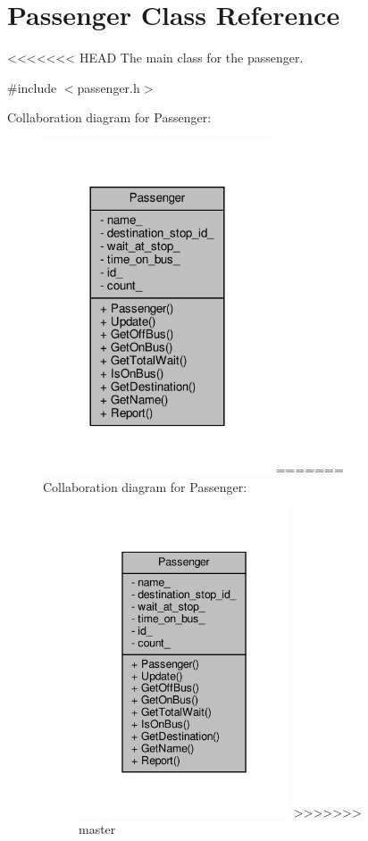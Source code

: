 \hypertarget{classPassenger}{}\section{Passenger Class Reference}
\label{classPassenger}


<<<<<<< HEAD
The main class for the passenger.  




{\ttfamily \#include $<$passenger.\+h$>$}



Collaboration diagram for Passenger\+:\nopagebreak
\begin{figure}[H]
\begin{center}
\leavevmode
\includegraphics[width=192pt]{classPassenger__coll__graph}
=======
Collaboration diagram for Passenger\+:
\nopagebreak
\begin{figure}[H]
\begin{center}
\leavevmode
\includegraphics[width=177pt]{classPassenger__coll__graph}
>>>>>>> master
\end{center}
\end{figure}

\end{center}
\end{figure}
